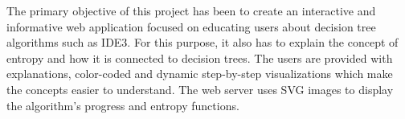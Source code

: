 
The primary objective of this project has been to create an interactive and informative web application focused on educating users about decision tree algorithms such as IDE3. For this purpose, it also has to explain the concept of entropy and how it is connected to decision trees. The users are provided with explanations, color-coded and dynamic step-by-step visualizations which make the concepts easier to understand. The web server uses SVG images to display the algorithm's progress and entropy functions. 